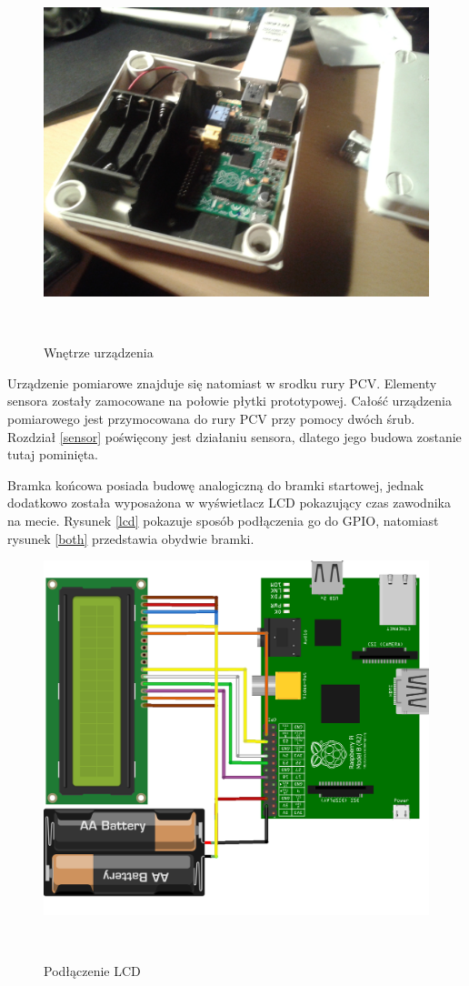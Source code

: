 \documentclass[11pt,a4paper, twoside]{article}
\begin{document}
\begin{figure}[H]
\begin{center}
\includegraphics[scale=0.08]{./img/insides1.jpg}
\caption{Wnętrze urządzenia}
$\label{skrzynka-in}$
\end{center}
\end{figure}
Urządzenie pomiarowe znajduje się natomiast w srodku rury PCV. Elementy sensora zostały zamocowane na połowie płytki prototypowej. Całość urządzenia pomiarowego jest przymocowana do rury PCV przy pomocy dwóch śrub. Rozdział \ref{sensor} poświęcony jest działaniu sensora, dlatego jego budowa zostanie tutaj pominięta.

Bramka końcowa posiada budowę analogiczną do bramki startowej, jednak dodatkowo została wyposażona w wyświetlacz LCD pokazujący czas zawodnika na mecie. Rysunek \ref{lcd} pokazuje sposób podłączenia go do GPIO, natomiast rysunek \ref{both} przedstawia obydwie bramki. 
\begin{figure}[H]
\begin{center}
\includegraphics[scale=0.125]{./img/lcd_bb.png}
\caption{Podłączenie LCD}
$\label{lcd}$
\end{center}
\end{figure}
\end{document}
